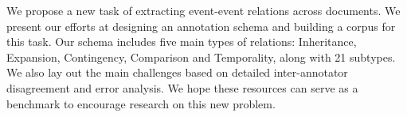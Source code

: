 We propose a new task of extracting event-event relations across documents. We present our efforts at designing an annotation schema and building a corpus for this task. Our schema includes five main types of relations: Inheritance, Expansion, Contingency, Comparison and Temporality, along with 21 subtypes. We also lay out the main challenges based on detailed inter-annotator disagreement and error analysis. We hope these resources can serve as a benchmark to encourage research on this new problem.
